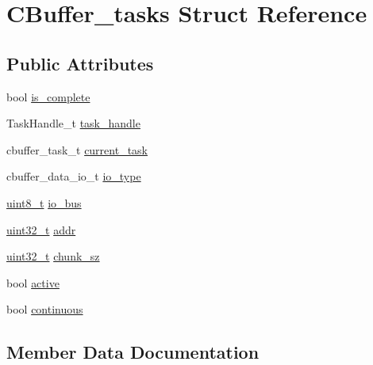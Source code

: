 \hypertarget{structCBuffer__tasks}{}\section{C\+Buffer\+\_\+tasks Struct Reference}
\label{structCBuffer__tasks}
\subsection*{Public Attributes}
\begin{DoxyCompactItemize}
\item 
bool \hyperlink{structCBuffer__tasks_a6e5bb0bf933ecab88d7644d4a5b3e330}{is\+\_\+complete}
\item 
Task\+Handle\+\_\+t \hyperlink{structCBuffer__tasks_a09da609f39eaa8121793e38e4bcc035f}{task\+\_\+handle}
\item 
cbuffer\+\_\+task\+\_\+t \hyperlink{structCBuffer__tasks_aa4f7c31fa199a454ace9d89bbd2d78ee}{current\+\_\+task}
\item 
cbuffer\+\_\+data\+\_\+io\+\_\+t \hyperlink{structCBuffer__tasks_a472c79ed1cd845b1cbb0dbfbdc72252b}{io\+\_\+type}
\item 
\hyperlink{vl53l0x__types_8h_aba7bc1797add20fe3efdf37ced1182c5}{uint8\+\_\+t} \hyperlink{structCBuffer__tasks_a8b8c2699de391e1e0d655b6700747724}{io\+\_\+bus}
\item 
\hyperlink{vl53l0x__types_8h_a435d1572bf3f880d55459d9805097f62}{uint32\+\_\+t} \hyperlink{structCBuffer__tasks_ac62a33234165a13d7fc5e4d45d63effc}{addr}
\item 
\hyperlink{vl53l0x__types_8h_a435d1572bf3f880d55459d9805097f62}{uint32\+\_\+t} \hyperlink{structCBuffer__tasks_a2a3ec116cd1b892f8225164ba08d519f}{chunk\+\_\+sz}
\item 
bool \hyperlink{structCBuffer__tasks_ab90079d87c7dd70bc9ed9196c01ef572}{active}
\item 
bool \hyperlink{structCBuffer__tasks_ae633b4c671970514edd12098451d4266}{continuous}
\end{DoxyCompactItemize}


\subsection{Member Data Documentation}
\mbox{\label{structCBuffer__tasks_ab90079d87c7dd70bc9ed9196c01ef572}} 
